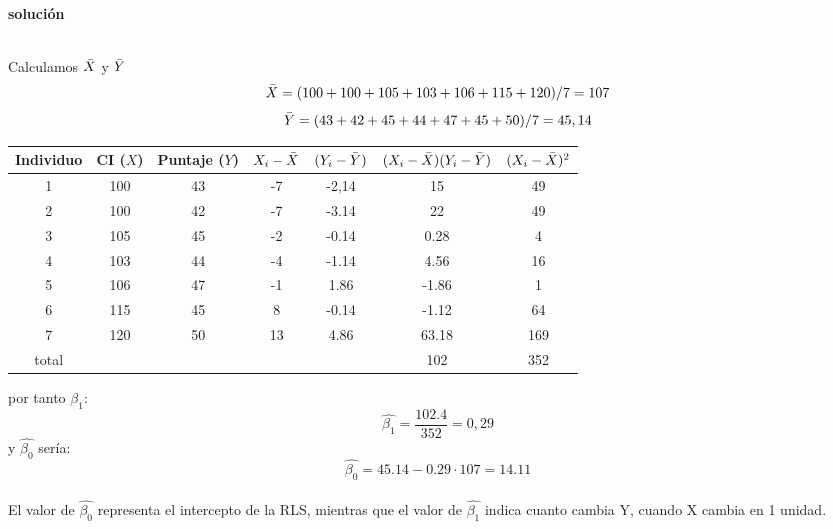 \documentclass[10pt,a4paper]{article}
\begin{document}
\begin{enumerate}
\begin{enumerate}
\\

\textbf{solución}

\\

Calculamos $\Bar{X}$ y $\Bar{Y}$
$$\Bar{X} = (100+100+105+103+106+115+120)/7=107$$
$$\Bar{Y}=(43+42+45+44+47+45+50)/7=45,14$$
\begin{center}
\begin{tabular}{|c|c|c|c|c|c|c|}
\hline
\textbf{Individuo} & \textbf{CI} ($X$) & \textbf{Puntaje} ($Y$) & $X_i-\Bar{X}$ & $(Y_i - \Bar{Y})$ & $(X_i-\Bar{X})(Y_i-\Bar{Y})$ & $(X_i-\Bar{X})^2$\\
\hline
1 & 100  & 43 & -7 & -2,14  &    15    & 49\\
2 & 100 & 42 &  -7 & -3.14 &    22    &   49 \\
3 & 105 & 45 & -2  & -0.14   &  0.28  & 4  \\
4 & 103 & 44 & -4  & -1.14   &  4.56     & 16 \\
5 & 106 & 47 & -1  & 1.86   &   -1.86    & 1  \\
6 & 115 & 45 &  8  & -0.14 &    -1.12    & 64 \\
7 & 120 & 50 & 13  & 4.86    &  63.18    & 169 \\
\hline
total & & & & & 102 & 352 
\end{tabular}
\end{center}
por tanto $\beta_1$:
$$\hat{\beta_1} = \frac{102.4}{352}=0,29$$
y $\hat{\beta_0}$ sería:
$$\hat{\beta_0}= 45.14-0.29\cdot 107 = 14.11$$
\\ 
    El valor de $\hat{\beta_0}$ representa el intercepto de la RLS, mientras que el valor de $\hat{\beta_1}$ indica cuanto cambia Y, cuando X cambia en 1 unidad.


\end{enumerate}
\end{enumerate}
\end{document}
